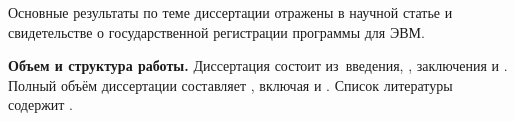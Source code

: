 Основные результаты по теме диссертации отражены в
научной статье и свидетельстве о государственной регистрации программы для
ЭВМ.

\textbf{Объем и структура работы.} Диссертация состоит из~введения,
,
заключения и
.
%
Полный объём диссертации составляет
, включая
 и
.
Список литературы содержит
.
